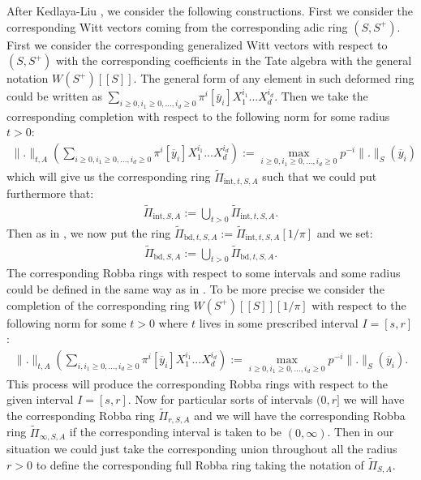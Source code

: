 \documentclass[12pt]{amsart}
\theoremstyle{definition}
\numberwithin{equation}{section}
\begin{document}
After Kedlaya-Liu \cite[Definition 4.1.1]{KL2}, we consider the following constructions. First we consider the corresponding Witt vectors coming from the corresponding adic ring $(S,S^+)$. First we consider the corresponding generalized Witt vectors with respect to $(S,S^+)$ with the corresponding coefficients in the Tate algebra with the general notation $W(S^+)[[S]]$. The general form of any element in such deformed ring could be written as $\sum_{i\geq 0,i_1\geq 0,...,i_d\geq 0}\pi^i[\overline{y}_i]X_1^{i_1}...X_d^{i_d}$. Then we take the corresponding completion with respect to the following norm for some radius $t>0$:
\begin{align}
\|.\|_{t,A}(\sum_{i\geq 0,i_1\geq 0,...,i_d\geq 0}\pi^i[\overline{y}_i]X_1^{i_1}...X_d^{i_d}):= \max_{i\geq 0,i_1\geq 0,...,i_d\geq 0}p^{-i}\|.\|_S(\overline{y}_i)	
\end{align}
which will give us the corresponding ring $\widetilde{\Pi}_{\mathrm{int},t,S,A}$ such that we could put furthermore that:
\begin{align}
\widetilde{\Pi}_{\mathrm{int},S,A}:=\bigcup_{t>0} \widetilde{\Pi}_{\mathrm{int},t,S,A}.	
\end{align}
Then as in \cite[Definition 4.1.1]{KL2}, we now put the ring $\widetilde{\Pi}_{\mathrm{bd},t,S,A}:=\widetilde{\Pi}_{\mathrm{int},t,S,A}[1/\pi]$ and we set:
\begin{align}
\widetilde{\Pi}_{\mathrm{bd},S,A}:=\bigcup_{t>0} \widetilde{\Pi}_{\mathrm{bd},t,S,A}.	
\end{align}
The corresponding Robba rings with respect to some intervals and some radius could be defined in the same way as in \cite[Definition 4.1.1]{KL2}. To be more precise we consider the completion of the corresponding ring $W(S^+)[[S]][1/\pi]$ with respect to the following norm for some $t>0$ where $t$ lives in some prescribed interval $I=[s,r]$: 
\begin{align}
\|.\|_{t,A}(\sum_{i,i_1\geq 0,...,i_d\geq 0}\pi^i[\overline{y}_i]X_1^{i_1}...X_d^{i_d}):= \max_{i\geq 0,i_1\geq 0,...,i_d\geq 0}p^{-i}\|.\|_S(\overline{y}_i).	
\end{align}
This process will produce the corresponding Robba rings with respect to  the given interval $I=[s,r]$. Now for particular sorts of intervals $(0,r]$ we will have the corresponding Robba ring $\widetilde{\Pi}_{r,S,A}$ and we will have the corresponding Robba ring $\widetilde{\Pi}_{\infty,S,A}$	if the corresponding interval is taken to be $(0,\infty)$. Then in our situation we could just take the corresponding union throughout all the radius $r>0$ to define the corresponding full Robba ring taking the notation of $\widetilde{\Pi}_{S,A}$.
\end{document}
